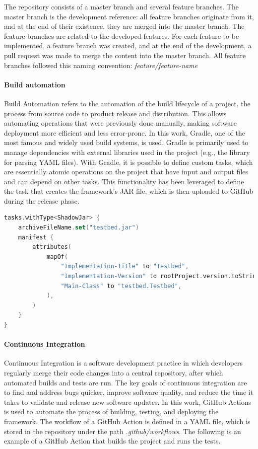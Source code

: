 \documentclass[12pt,a4paper,openright,twoside]{book}
\begin{document}
The repository consists of a master branch and several feature branches.
The master branch is the development reference: all feature branches originate from it, and at the end of their existence, they are merged into the master branch.
The feature branches are related to the developed features. 
For each feature to be implemented, a feature branch was created, and at the end of the development, a pull request was made to merge the content into the master branch.
All feature branches followed this naming convention: \textit{feature/{feature-name}}

\paragraph*{Build automation}
Build Automation refers to the automation of the build lifecycle of a project, the process from source code to product release and distribution. 
This allows automating operations that were previously done manually, making software deployment more efficient and less error-prone.
In this work, Gradle, one of the most famous and widely used build systems, is used. 
Gradle is primarily used to manage dependencies with external libraries used in the project (e.g., the library for parsing YAML files).
With Gradle, it is possible to define custom tasks, which are essentially atomic operations on the project that have input and output files and can depend on other tasks. 
This functionality has been leveraged to define the task that creates the framework's JAR file, which is then uploaded to GitHub during the release phase.

\begin{lstlisting}[language=kt]
  tasks.withType<ShadowJar> {
    archiveFileName.set("testbed.jar")
    manifest {
        attributes(
            mapOf(
                "Implementation-Title" to "Testbed",
                "Implementation-Version" to rootProject.version.toString(),
                "Main-Class" to "testbed.Testbed",
            ),
        )
    }
}
\end{lstlisting}

\paragraph*{Continuous Integration}
Continuous Integration is a software development practice in which developers regularly merge their code changes into a central repository, after which automated builds and tests are run.
The key goals of continuous integration are to find and address bugs quicker, improve software quality, and reduce the time it takes to validate and release new software updates.
In this work, GitHub Actions is used to automate the process of building, testing, and deploying the framework.
The workflow of a GitHub Action is defined in a YAML file, which is stored in the repository under the path \textit{.github/workflows}.
The following is an example of a GitHub Action that builds the project and runs the tests.
\end{document}
